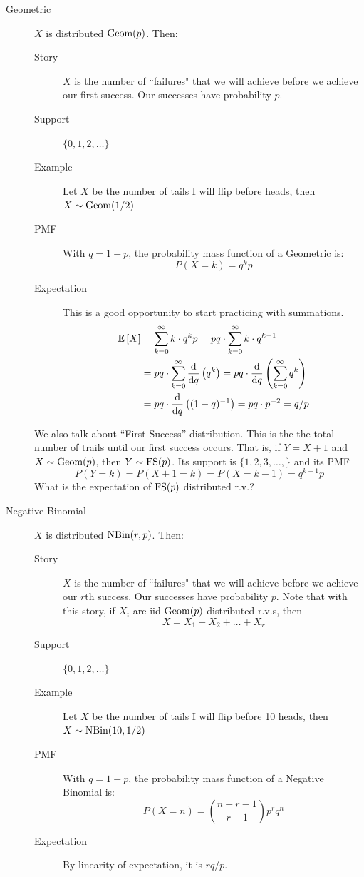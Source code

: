 \documentclass[11pt]{article}
\theoremstyle{definition}
\theoremstyle{remark}
\newcommand{\E}[1]{\mathbb{E}\left[ #1 \right]}
\newcommand{\NBin}{\textnormal{NBin}}
\newcommand{\Geom}{\textnormal{Geom}}
\newcommand{\FS}{\textnormal{FS}}
\begin{document}
\begin{description}
\item[Geometric] $X$ is distributed $\Geom(p)$. Then:
\begin{description}
	\item[Story] $X$ is the number of ``failures" that we will achieve before we achieve our first success. Our successes have probability $p$.
	\item[Support] $\{0,1,2, \ldots\}$
	\item[Example] Let $X$ be the number of tails I will flip before heads, then $X \sim \Geom(1/2)$
	\item[PMF] With $q = 1-p$, the probability mass function of a Geometric is:
        $$P(X = k) = q^kp$$
    \item[Expectation] This is a good opportunity to start practicing with summations. \begin{align*}
        \E{X} & = \sum_{k=0}^{\infty} k \cdot q^k p = p q \cdot \sum_{k=0}^{\infty} k \cdot q^{k-1} \\
        & = p q \cdot \sum_{k=0}^{\infty} \dv{}{q} \left( q^k \right) = p q \cdot \dv{}{q} \left( \sum_{k=0}^{\infty} q^k \right) \\
        & = p q \cdot \dv{}{q} \left( (1-q)^{-1} \right) = pq \cdot p^{-2} = q/p \\
    \end{align*}
\end{description}

\Biohazard We also talk about ``First Success'' distribution. This is the the total number of trails until our first success occurs. That is, if $Y=X+1$ and $X \sim \Geom(p)$, then $Y \sim \FS(p)$. Its support is $\{1,2,3,\ldots,\}$ and its PMF $$P(Y = k) = P(X+1 = k) = P(X = k-1) = q^{k-1}p$$ What is the expectation of $\FS(p)$ distributed r.v.? 

\pagebreak

\item[Negative Binomial] $X$ is distributed $\NBin(r, p)$. Then:
\begin{description}
	\item[Story] $X$ is the number of ``failures" that we will achieve before we achieve our $r$th success. Our successes have probability $p$. Note that with this story, if $X_i$ are iid $\Geom(p)$ distributed r.v.s, then $$ X = X_1 + X_2 + \ldots + X_r $$
	\item[Support] $\{0,1,2,\ldots\}$
	\item[Example] Let $X$ be the number of tails I will flip before 10 heads, then $X \sim \NBin(10,1/2)$
	\item[PMF] With $q = 1-p$, the probability mass function of a Negative Binomial is:
        $$P(X = n) = \binom{n+r - 1}{r -1}p^rq^n$$
    \item[Expectation] By linearity of expectation, it is $rq/p$. 
\end{description}


\end{description}
\end{document}
